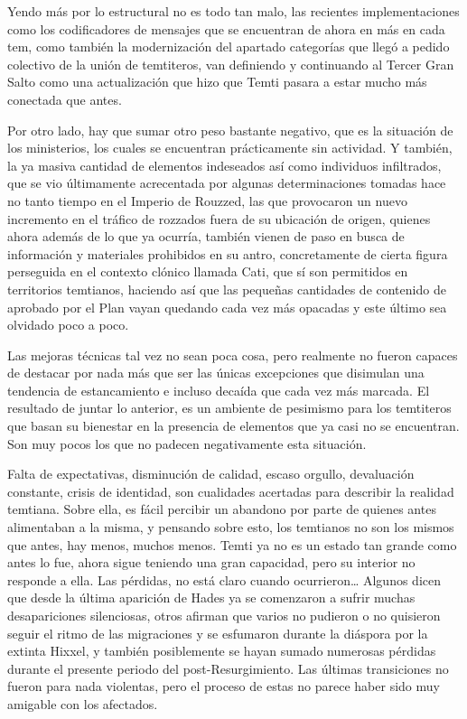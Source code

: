 \documentclass[
]{book}
\begin{document}
Yendo más por lo estructural no es todo tan malo, las recientes implementaciones como los codificadores de mensajes que se encuentran de ahora en más en cada tem, como también la modernización del apartado categorías que llegó a pedido colectivo de la unión de temtiteros, van definiendo y continuando al Tercer Gran Salto como una actualización que hizo que Temti pasara a estar mucho más conectada que antes.

Por otro lado, hay que sumar otro peso bastante negativo, que es la situación de los ministerios, los cuales se encuentran prácticamente sin actividad. Y también, la ya masiva cantidad de elementos indeseados así como individuos infiltrados, que se vio últimamente acrecentada por algunas determinaciones tomadas hace no tanto tiempo en el Imperio de Rouzzed, las que provocaron un nuevo incremento en el tráfico de rozzados fuera de su ubicación de origen, quienes ahora además de lo que ya ocurría, también vienen de paso en busca de información y materiales prohibidos en su antro, concretamente de cierta figura perseguida en el contexto clónico llamada Cati, que sí son permitidos en territorios temtianos, haciendo así que las pequeñas cantidades de contenido de aprobado por el Plan vayan quedando cada vez más opacadas y este último sea olvidado poco a poco.

Las mejoras técnicas tal vez no sean poca cosa, pero realmente no fueron capaces de destacar por nada más que ser las únicas excepciones que disimulan una tendencia de estancamiento e incluso decaída que cada vez más marcada. El resultado de juntar lo anterior, es un ambiente de pesimismo para los temtiteros que basan su bienestar en la presencia de elementos que ya casi no se encuentran. Son muy pocos los que no padecen negativamente esta situación.

Falta de expectativas, disminución de calidad, escaso orgullo, devaluación constante, crisis de identidad, son cualidades acertadas para describir la realidad temtiana. Sobre ella, es fácil percibir un abandono por parte de quienes antes alimentaban a la misma, y pensando sobre esto, los temtianos no son los mismos que antes, hay menos, muchos menos. Temti ya no es un estado tan grande como antes lo fue, ahora sigue teniendo una gran capacidad, pero su interior no responde a ella. Las pérdidas, no está claro cuando ocurrieron\ldots{} Algunos dicen que desde la última aparición de Hades ya se comenzaron a sufrir muchas desapariciones silenciosas, otros afirman que varios no pudieron o no quisieron seguir el ritmo de las migraciones y se esfumaron durante la diáspora por la extinta Hixxel, y también posiblemente se hayan sumado numerosas pérdidas durante el presente periodo del post-Resurgimiento. Las últimas transiciones no fueron para nada violentas, pero el proceso de estas no parece haber sido muy amigable con los afectados.
\end{document}
